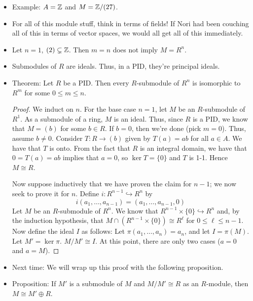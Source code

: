 \documentclass[../notes.tex]{subfiles}
\begin{document}
\begin{itemize}
\begin{figure}[H]
        \caption{First isomorphism theorem of modules.}
        \label{fig:FITModule}
    \end{figure}
    \begin{proof}
        See Theorem \ref{trm:10.4a}.
    \end{proof}
    \item Example: $A=\mathbb{Z}$ and $M=\mathbb{Z}/(27)$.
    \item For all of this module stuff, think in terms of fields! If Nori had been couching all of this in terms of vector spaces, we would all get all of this immediately.
    \item Let $n=1$, $(2)\subsetneq\mathbb{Z}$. Then $m=n$ does not imply $M=R^n$.
    \item Submodules of $R$ are ideals. Thus, in a PID, they're principal ideals.
    \item Theorem: Let $R$ be a PID. Then every $R$-submodule of $R^n$ is isomorphic to $R^m$ for some $0\leq m\leq n$.
    \begin{proof}
        We induct on $n$. For the base case $n=1$, let $M$ be an $R$-submodule of $R^1$. As a submodule of a ring, $M$ is an ideal. Thus, since $R$ is a PID, we know that $M=(b)$ for some $b\in R$. If $b=0$, then we're done (pick $m=0$). Thus, assume $b\neq 0$. Consider $T:R\to(b)$ given by $T(a)=ab$ for all $a\in A$. We have that $T$ is onto. From the fact that $R$ is an integral domain, we have that $0=T(a)=ab$ implies that $a=0$, so $\ker T=\{0\}$ and $T$ is 1-1. Hence $M\cong R$.\par
        Now suppose inductively that we have proven the claim for $n-1$; we now seek to prove it for $n$. Define $i:R^{n-1}\hookrightarrow R^n$ by
        \begin{equation*}
            i(a_1,\dots,a_{n-1}) = (a_1,\dots,a_{n-1},0)
        \end{equation*}
        Let $M$ be an $R$-submodule of $R^n$. We know that $R^{n-1}\times\{0\}\hookrightarrow R^n$ and, by the induction hypothesis, that $M\cap(R^{n-1}\times\{0\})\cong R^\ell$ for $0\leq\ell\leq n-1$. Now define the ideal $I$ as follows: Let $\pi(a_1,\dots,a_n)=a_n$, and let $I=\pi(M)$. Let $M'=\ker\pi$. $M/M'\cong I$. At this point, there are only two cases ($a=0$ and $a=M$).
    \end{proof}
    \item Next time: We will wrap up this proof with the following proposition.
    \item Proposition: If $M'$ is a submodule of $M$ and $M/M'\cong R$ as an $R$-module, then $M\cong M'\oplus R$.
\end{itemize}
\end{document}
